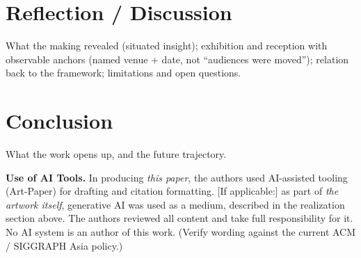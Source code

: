\documentclass[sigconf,nonacm]{acmart}
\begin{document}
\section{Reflection / Discussion}
What the making revealed (situated insight); exhibition and reception with
observable anchors (named venue + date, not ``audiences were moved''); relation
back to the framework; limitations and open questions.

\section{Conclusion}
What the work opens up, and the future trajectory.

\begin{acks}
\textbf{Use of AI Tools.} In producing \emph{this paper}, the authors used
AI-assisted tooling (Art-Paper) for drafting and citation
formatting. [If applicable:] as part of \emph{the artwork itself}, generative AI
was used as a medium, described in the realization section above. The authors
reviewed all content and take full responsibility for it. No AI system is an
author of this work. (Verify wording against the current ACM / SIGGRAPH Asia
policy.)
\end{acks}



\end{document}
